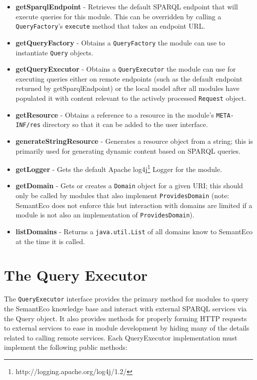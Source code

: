 \documentclass[letterpaper]{report}
\begin{document}
\begin{itemize}
\item\textbf{getSparqlEndpoint} - Retrieves the default SPARQL endpoint that will execute queries for this module. This can be overridden by calling a \texttt{QueryFactory}'s \texttt{execute} method that takes an endpoint URL.
\item\textbf{getQueryFactory} - Obtains a \texttt{QueryFactory} the module can use to instantiate \texttt{Query} objects.
\item\textbf{getQueryExecutor} - Obtains a \texttt{QueryExecutor} the module can use for executing queries either on remote endpoints (such as the default endpoint returned by getSparqlEndpoint) or the local model after all modules have populated it with content relevant to the actively processed \texttt{Request} object.
\item\textbf{getResource} - Obtains a reference to a resource in the module's \texttt{META-INF/res} directory so that it can be added to the user interface.
\item\textbf{generateStringResource} - Generates a resource object from a string; this is primarily used for generating dynamic content based on SPARQL queries.
\item\textbf{getLogger} - Gets the default Apache log4j\footnote{http://logging.apache.org/log4j/1.2/} Logger for the module.
\item\textbf{getDomain} - Gets or creates a \texttt{Domain} object for a given URI; this should only be called by modules that also implement \texttt{ProvidesDomain} (note: SemantEco does not enforce this but interaction with domains are limited if a module is not also an implementation of \texttt{ProvidesDomain}).
\item\textbf{listDomains} - Returns a \texttt{java.util.List} of all domains know to SemantEco at the time it is called.
\end{itemize}

\section{The Query Executor}
\label{query-executor}
The \texttt{QueryExecutor} interface provides the primary method for modules to query the SemantEco knowledge base and interact with external SPARQL services via the Query object. It also provides methods for properly forming HTTP requests to external services to ease in module development by hiding many of the details related to calling remote services. Each QueryExecutor implementation must implement the following public methods:
\end{document}
